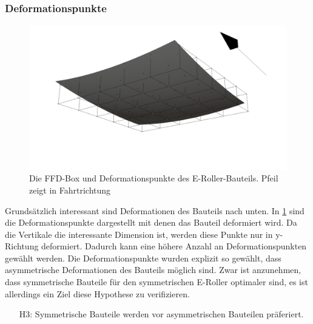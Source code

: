 \subsubsection{Deformationspunkte}
\begin{figure}[h]
	\centering
	\includegraphics[width=.8\linewidth]{bilder/escooter_deformationPoints}
	\caption{Die FFD-Box und Deformationspunkte des E-Roller-Bauteils. Pfeil zeigt in Fahrtrichtung}
	\label{fig:escooter_deformation}
\end{figure}
Grundsätzlich interessant sind Deformationen des Bauteils nach unten.
In \cref{fig:escooter_deformation} sind die Deformationspunkte dargestellt mit denen das Bauteil deformiert wird.
Da die Vertikale die interessante Dimension ist, werden diese Punkte nur in y-Richtung deformiert.
Dadurch kann eine höhere Anzahl an Deformationspunkten gewählt werden.
Die Deformationspunkte wurden explizit so gewählt, dass asymmetrische Deformationen des Bauteils möglich sind.
Zwar ist anzunehmen, dass symmetrische Bauteile für den symmetrischen E-Roller optimaler sind, es ist allerdings ein Ziel diese Hypothese zu verifizieren.
\begin{itemize}
	\item[H3:] Symmetrische Bauteile werden vor asymmetrischen Bauteilen präferiert.
\end{itemize}






